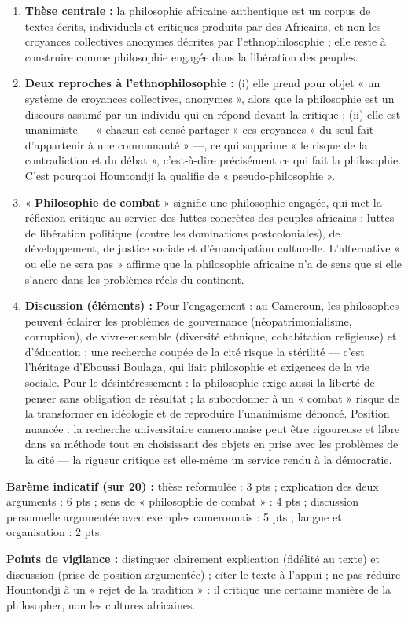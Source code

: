 \documentclass[11pt]{article}
\begin{document}
\begin{corrige}
\begin{enumerate}
\item \textbf{Thèse centrale :} la philosophie africaine authentique est un corpus de textes écrits, individuels et critiques produits par des Africains, et non les croyances collectives anonymes décrites par l'ethnophilosophie ; elle reste à construire comme philosophie engagée dans la libération des peuples.
\item \textbf{Deux reproches à l'ethnophilosophie :} (i) elle prend pour objet « un système de croyances collectives, anonymes », alors que la philosophie est un discours assumé par un individu qui en répond devant la critique ; (ii) elle est unanimiste — « chacun est censé partager » ces croyances « du seul fait d'appartenir à une communauté » —, ce qui supprime « le risque de la contradiction et du débat », c'est-à-dire précisément ce qui fait la philosophie. C'est pourquoi Hountondji la qualifie de « pseudo-philosophie ».
\item « \textbf{Philosophie de combat} » signifie une philosophie engagée, qui met la réflexion critique au service des luttes concrètes des peuples africains : luttes de libération politique (contre les dominations postcoloniales), de développement, de justice sociale et d'émancipation culturelle. L'alternative « ou elle ne sera pas » affirme que la philosophie africaine n'a de sens que si elle s'ancre dans les problèmes réels du continent.
\item \textbf{Discussion (éléments) :} Pour l'engagement : au Cameroun, les philosophes peuvent éclairer les problèmes de gouvernance (néopatrimonialisme, corruption), de vivre-ensemble (diversité ethnique, cohabitation religieuse) et d'éducation ; une recherche coupée de la cité risque la stérilité — c'est l'héritage d'Eboussi Boulaga, qui liait philosophie et exigences de la vie sociale. Pour le désintéressement : la philosophie exige aussi la liberté de penser sans obligation de résultat ; la subordonner à un « combat » risque de la transformer en idéologie et de reproduire l'unanimisme dénoncé. Position nuancée : la recherche universitaire camerounaise peut être rigoureuse et libre dans sa méthode tout en choisissant des objets en prise avec les problèmes de la cité — la rigueur critique est elle-même un service rendu à la démocratie.
\end{enumerate}
\textbf{Barème indicatif (sur 20) :} thèse reformulée : 3 pts ; explication des deux arguments : 6 pts ; sens de « philosophie de combat » : 4 pts ; discussion personnelle argumentée avec exemples camerounais : 5 pts ; langue et organisation : 2 pts.

\textbf{Points de vigilance :} distinguer clairement explication (fidélité au texte) et discussion (prise de position argumentée) ; citer le texte à l'appui ; ne pas réduire Hountondji à un « rejet de la tradition » : il critique une certaine manière de la philosopher, non les cultures africaines.
\end{corrige}
\end{document}
